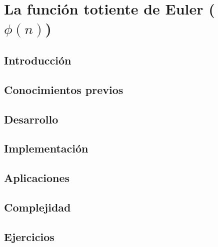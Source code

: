 \chapter{La función totiente de Euler ($\phi(n)$)}
\section{Introducción}

\section{Conocimientos previos}

\section{Desarrollo}

\section{Implementación}

\section{Aplicaciones}

\section{Complejidad}

\section{Ejercicios}
